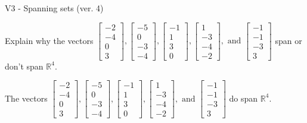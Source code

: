 \begin{exercise}
  \begin{exerciseTitle}V3 - Spanning sets (ver. 4)\end{exerciseTitle}
  \begin{exerciseStatement}
    Explain why the vectors \(\left[\begin{array}{r}
-2 \\
-4 \\
0 \\
3
\end{array}\right] , \left[\begin{array}{r}
-5 \\
0 \\
-3 \\
-4
\end{array}\right] , \left[\begin{array}{r}
-1 \\
1 \\
3 \\
0
\end{array}\right] , \left[\begin{array}{r}
1 \\
-3 \\
-4 \\
-2
\end{array}\right] , \text{ and } \left[\begin{array}{r}
-1 \\
-1 \\
-3 \\
3
\end{array}\right]\) span or don't span \(\mathbb{R}^4\). 
	


  \end{exerciseStatement}
  \begin{exerciseAnswer}
   The vectors \(\left[\begin{array}{r}
-2 \\
-4 \\
0 \\
3
\end{array}\right] , \left[\begin{array}{r}
-5 \\
0 \\
-3 \\
-4
\end{array}\right] , \left[\begin{array}{r}
-1 \\
1 \\
3 \\
0
\end{array}\right] , \left[\begin{array}{r}
1 \\
-3 \\
-4 \\
-2
\end{array}\right] , \text{ and } \left[\begin{array}{r}
-1 \\
-1 \\
-3 \\
3
\end{array}\right]\) 
  	 do  
	span \(\mathbb{R}^4\).
  



\end{exerciseAnswer}
\end{exercise}

